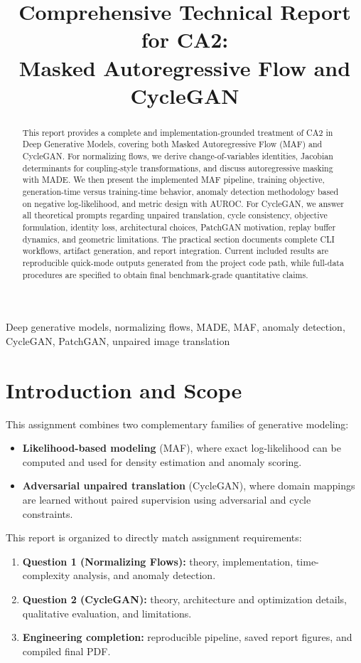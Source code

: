 \documentclass[conference]{IEEEtran}
\title{Comprehensive Technical Report for CA2:\\
Masked Autoregressive Flow and CycleGAN}
\author{\IEEEauthorblockN{Mohammad Taha Majlesi}
\IEEEauthorblockA{\textit{Department of Computer Engineering} \\
\textit{University of Tehran} \\
Email: taha.majlesi@ut.ac.ir}}
\begin{document}
\maketitle

\begin{abstract}
This report provides a complete and implementation-grounded treatment of CA2 in Deep Generative Models, covering both Masked Autoregressive Flow (MAF) and CycleGAN. For normalizing flows, we derive change-of-variables identities, Jacobian determinants for coupling-style transformations, and discuss autoregressive masking with MADE. We then present the implemented MAF pipeline, training objective, generation-time versus training-time behavior, anomaly detection methodology based on negative log-likelihood, and metric design with AUROC. For CycleGAN, we answer all theoretical prompts regarding unpaired translation, cycle consistency, objective formulation, identity loss, architectural choices, PatchGAN motivation, replay buffer dynamics, and geometric limitations. The practical section documents complete CLI workflows, artifact generation, and report integration. Current included results are reproducible quick-mode outputs generated from the project code path, while full-data procedures are specified to obtain final benchmark-grade quantitative claims.
\end{abstract}

\begin{IEEEkeywords}
Deep generative models, normalizing flows, MADE, MAF, anomaly detection, CycleGAN, PatchGAN, unpaired image translation
\end{IEEEkeywords}

\section{Introduction and Scope}
This assignment combines two complementary families of generative modeling:
\begin{itemize}
\item \textbf{Likelihood-based modeling} (MAF), where exact log-likelihood can be computed and used for density estimation and anomaly scoring.
\item \textbf{Adversarial unpaired translation} (CycleGAN), where domain mappings are learned without paired supervision using adversarial and cycle constraints.
\end{itemize}

This report is organized to directly match assignment requirements:
\begin{enumerate}
\item \textbf{Question 1 (Normalizing Flows):} theory, implementation, time-complexity analysis, and anomaly detection.
\item \textbf{Question 2 (CycleGAN):} theory, architecture and optimization details, qualitative evaluation, and limitations.
\item \textbf{Engineering completion:} reproducible pipeline, saved report figures, and compiled final PDF.
\end{enumerate}
\end{document}
